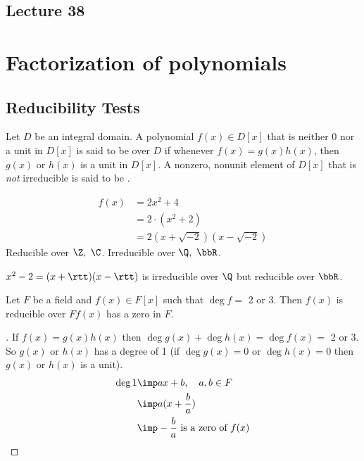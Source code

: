 \documentclass[a4paper]{article}
\begin{document}
\subsection*{Lecture 38} %
\section{Factorization of polynomials}
\subsection{Reducibility Tests}
\begin{definition}
  Let \( D \) be an integral domain.
  A polynomial \( f(x)\in D[x] \) that is neither 0 nor a unit in \( D[x] \) is said to be  over \( D \) if whenever \( f(x) = g(x)h(x) \), then \( g(x) \) or \( h(x) \) is a unit in \( D[x] \). A nonzero, nonunit element of \( D[x] \) that is \emph{not} irreducible is said to be .
\end{definition}

\begin{example}
  \begin{align*}
    f(x) &= 2x^2 + 4 \\ &= 2\cdot (x^2+2) \\ &= 2(x+\sqrt{-2})(x-\sqrt{-2})
  \end{align*}
  Reducible over \( \Z,\ \C \). Irreducible over \( \Q,\ \bbR \).
\end{example}

\begin{example}
  \( x^2-2 = (x+\rtt)(x-\rtt) \) is irreducible over \( \Q \) but reducible over \( \bbR \).
\end{example}

\begin{theorem}
  Let \( F \) be a field and \( f(x) \in F[x] \) such that \( \deg f =\) 2 or 3.
  Then \( f(x) \) is reducible over \( F \)\iff \( f(x) \) has a zero in \( F \).
\end{theorem}

\begin{proof}[]
  If \( f(x) = g(x)h(x) \) then \( \deg g(x) + \deg h(x) = \deg f(x) = \) 2 or 3.
  So \( g(x) \) or \( h(x) \) has a degree of 1 (if \( \deg g(x) = 0 \) or \( \deg h(x) = 0 \) then \( g(x) \) or \( h(x) \) is a unit).
  \begin{align*}
    \deg 1 &\imp ax+b,\quad a,b\in F \\
           &\imp a(x+\frac{b}{a}) \\
           &\imp -\frac{b}{a} \text{ is a zero of } f(x)
  \end{align*}
\end{proof}
\end{document}
